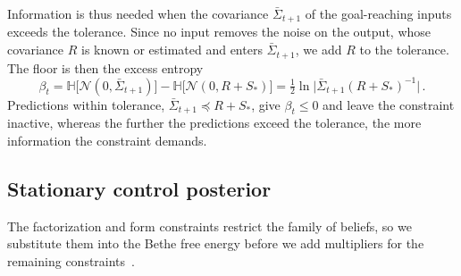 \documentclass{l4dc2027}
\def\cN{\mathcal{N}}
\begin{document}
Information is thus needed when the covariance $\bar{\Sigma}_{t+1}$ of the goal-reaching inputs exceeds the tolerance. Since no input removes the noise on the output, whose covariance $R$ is known or estimated and enters $\bar{\Sigma}_{t+1}$, we add $R$ to the tolerance. The floor is then the excess entropy
\begin{equation}\label{eq:floor}
	\beta_t = \mathbb{H}\big[\cN(0, \bar{\Sigma}_{t+1})\big] - \mathbb{H}\big[\cN(0, R + S_*)\big] = \tfrac{1}{2}\ln\big|\bar{\Sigma}_{t+1} (R + S_*)^{-1}\big| \, .
\end{equation}
Predictions within tolerance, $\bar{\Sigma}_{t+1} \preceq R + S_*$, give $\beta_t \leq 0$ and leave the constraint inactive, whereas the further the predictions exceed the tolerance, the more information the constraint demands.

\subsection{Stationary control posterior}

The factorization and form constraints restrict the family of beliefs, so we substitute them into the Bethe free energy before we add multipliers for the remaining constraints~\citep{csenoz2021variational}. 
\end{document}
